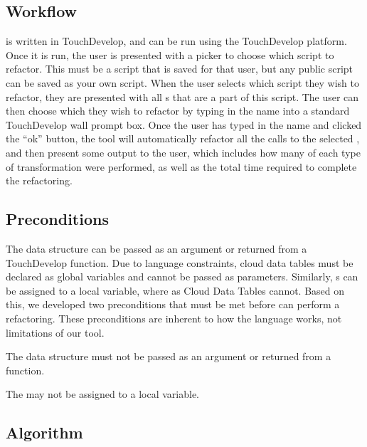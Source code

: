 \documentclass{sigplanconf}
\begin{document}
\subsection{Workflow}
\label{sec:workflow}

\tool is written in TouchDevelop, and can be run using the TouchDevelop platform.  Once it is run, the user is presented with a picker to choose which script to refactor.  This must be a script that is saved for that user, but any public script can be saved as your own script. When the user selects which script they wish to refactor, they are presented with all \NC{}s that are a part of this script.  The user can then choose which \NC{} they wish to refactor by typing in the name into a standard TouchDevelop wall prompt box. Once the user has typed in the name and clicked the ``ok'' button, the tool will automatically refactor all the calls to the selected \NC{}, and then present some output to the user, which includes how many of each type of transformation were performed, as well as the total time required to complete the refactoring. 

\subsection{Preconditions}
\label{sec:preconditions}

The \NC{} data structure can be passed as an argument or returned from a TouchDevelop function.  Due to language constraints, cloud data tables must be declared as global variables and cannot be passed as parameters.  Similarly, \NC{}s can be assigned to a local variable, where as Cloud Data Tables cannot.  Based on this, we developed two preconditions that must be met before \tool can perform a refactoring.  These preconditions are inherent to how the \TD language works, not limitations of our tool.  

\POne  The \NC{} data structure must not be passed as an argument or returned from a \TD function. 

\PTwo The \NC{} may not be assigned to a local variable.



\subsection{Algorithm}
\label{sec:algorithm}
\end{document}
